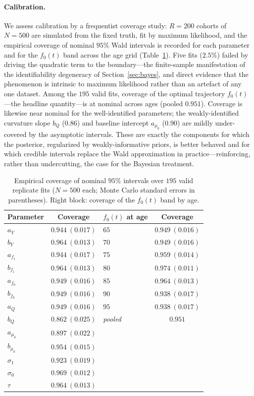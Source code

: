 \documentclass[review,3p,times]{elsarticle}
\newcommand{\fzero}{f_0}
\begin{document}
\paragraph{Calibration.} We assess calibration by a frequentist coverage study:
$R=200$ cohorts of $N=500$ are simulated from the fixed truth, fit by maximum
likelihood, and the empirical coverage of nominal $95\%$ Wald intervals is recorded
for each parameter and for the $\fzero(t)$ band across the age grid
(Table~\ref{tab:coverage}). Five fits ($2.5\%$) failed by driving the quadratic
term to the boundary---the finite-sample manifestation of the identifiability
degeneracy of Section~\ref{sec:bayes}, and direct evidence that the phenomenon is
intrinsic to maximum likelihood rather than an artefact of any one dataset. Among
the $195$ valid fits, coverage of the optimal trajectory $\fzero(t)$---the headline
quantity---is at nominal across ages (pooled $0.951$). Coverage is likewise near
nominal for the well-identified parameters; the weakly-identified curvature slope
$b_Q$ ($0.86$) and baseline intercept $a_{\mu_0}$ ($0.90$) are mildly under-covered
by the asymptotic intervals. These are exactly the components for which the
posterior, regularized by weakly-informative priors, is better behaved and for
which credible intervals replace the Wald approximation in practice---reinforcing,
rather than undercutting, the case for the Bayesian treatment.

\begin{table}[t]\centering
\caption{Empirical coverage of nominal $95\%$ intervals over $195$ valid
replicate fits ($N=500$ each; Monte Carlo standard errors in parentheses). Right
block: coverage of the $\fzero(t)$ band by age.}
\label{tab:coverage}
\begin{tabular}{lc@{\hskip 2em}lc}
\toprule
Parameter & Coverage & $\fzero(t)$ at age & Coverage \\
\midrule
$a_Y$      & $0.944\ (0.017)$ & $65$ & $0.949\ (0.016)$\\
$b_Y$      & $0.964\ (0.013)$ & $70$ & $0.949\ (0.016)$\\
$a_{f_1}$  & $0.944\ (0.017)$ & $75$ & $0.959\ (0.014)$\\
$b_{f_1}$  & $0.964\ (0.013)$ & $80$ & $0.974\ (0.011)$\\
$a_{f_0}$  & $0.949\ (0.016)$ & $85$ & $0.964\ (0.013)$\\
$b_{f_0}$  & $0.949\ (0.016)$ & $90$ & $0.938\ (0.017)$\\
$a_Q$      & $0.949\ (0.016)$ & $95$ & $0.938\ (0.017)$\\
$b_Q$      & $0.862\ (0.025)$ & \textit{pooled} & $\mathbf{0.951}$\\
$a_{\mu_0}$& $0.897\ (0.022)$ & & \\
$b_{\mu_0}$& $0.954\ (0.015)$ & & \\
$\sigma_1$ & $0.923\ (0.019)$ & & \\
$\sigma_0$ & $0.969\ (0.012)$ & & \\
$\tau$     & $0.964\ (0.013)$ & & \\
\bottomrule
\end{tabular}
\end{table}
\end{document}
